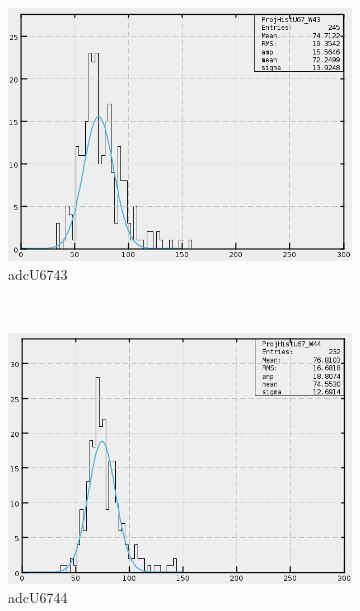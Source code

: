 \begin{figure}[h]
\begin{subfigure}[h]{0.3\textwidth}
        \includegraphics[width=\textwidth, keepaspectratio = true]{adcU67_43}
        \caption{adcU6743}
        \label{fig:adcU67_43}
    \end{subfigure}
    \\
    \begin{subfigure}[h]{0.3\textwidth}
        \centering
        \includegraphics[width=\textwidth, keepaspectratio = true]{adcU67_44}
        \caption{adcU6744}
        \label{fig:adcU67_44}
    \end{subfigure}
    ~
    \begin{subfigure}[h]{0.3\textwidth}
        \centering

\end{subfigure}
\end{figure}
